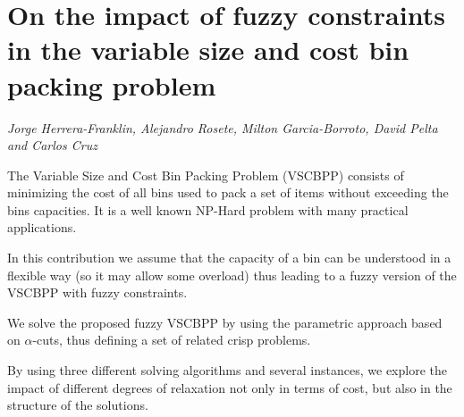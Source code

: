 \documentclass[../booklet.tex]{subfiles}
\begin{document}
\section[On the impact of fuzzy constraints in the variable size and cost bin packing problem. {\it Jorge Herrera-Franklin, Alejandro Rosete, Milton Garcia-Borroto, David Pelta and Carlos Cruz}]{On the impact of fuzzy constraints in the variable size and cost bin packing problem}
    

\begin{center}
  {\it Jorge Herrera-Franklin, Alejandro Rosete, Milton Garcia-Borroto, David Pelta and Carlos Cruz}
\end{center}

\vskip 0.8cm


The Variable Size and Cost Bin Packing Problem (VSCBPP) consists of minimizing the cost of all bins used to pack a set of items without exceeding the bins capacities.
It is a well known NP-Hard problem with many practical applications.

In this contribution we assume that the capacity of a bin can be understood in a flexible way (so it may allow some overload) thus leading to a fuzzy version of the VSCBPP with fuzzy constraints.


We solve the proposed fuzzy VSCBPP by using the parametric approach based on $\alpha$-cuts, thus defining a set of related crisp problems.

By using three different solving algorithms and several instances, we explore the impact of different degrees of relaxation not only in terms of cost, but also in the structure of the solutions.


\end{document}

